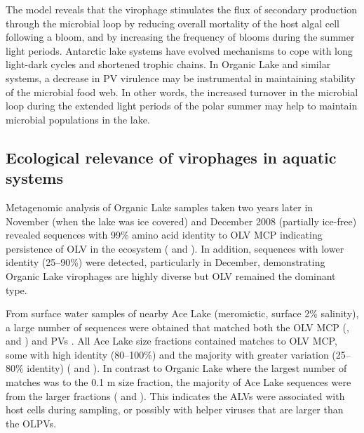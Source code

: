 The model reveals that the virophage stimulates the flux of secondary production through the microbial loop by reducing overall mortality of the host algal cell following a bloom, and by increasing the frequency of blooms during the summer light periods. 
Antarctic lake systems have evolved mechanisms to cope with long light-dark cycles \cite{Lauro2011} and shortened trophic chains. 
In Organic Lake and similar systems, a decrease in \ac{PV} virulence may be instrumental in maintaining stability of the microbial food web. 
In other words, the increased turnover in the microbial loop during the extended light periods of the polar summer may help to maintain microbial populations in the lake.

\subsection{Ecological relevance of virophages in aquatic systems}
Metagenomic analysis of Organic Lake samples taken two years later in November (when the lake was ice covered) and December 2008 (partially ice-free) revealed sequences with 99\% amino acid identity to \ac{OLV} \ac{MCP} indicating persistence of \ac{OLV} in the ecosystem ( and ). 
In addition, sequences with lower identity (25--90\%) were detected, particularly in December, demonstrating Organic Lake virophages are highly diverse but \ac{OLV} remained the dominant type. 



From surface water samples of nearby Ace Lake (meromictic, surface 2\% salinity), a large number of sequences were obtained that matched both the \ac{OLV} \ac{MCP} (,  and ) and \acp{PV} \cite{Lauro2011}. %
All Ace Lake size fractions contained matches to \ac{OLV} \ac{MCP}, some with high identity (80--100\%) and the majority with greater variation (25--80\% identity) ( and ). 
In contrast to Organic Lake where the largest number of matches was to the 0.1 \textmu{}m size fraction, the majority of Ace Lake sequences were from the larger fractions ( and ). 
This indicates the \acp{ALV} were associated with host cells during sampling, or possibly with helper viruses that are larger than the \acp{OLPV}. 


